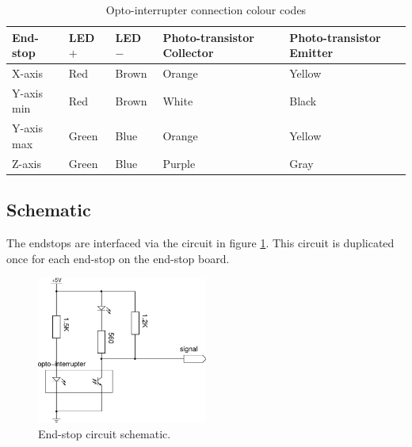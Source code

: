 			\begin{table}[p]
				\centering
				\begin{tabular}{l l l l l}
					\toprule
					End-stop & LED $+$ & LED $-$ & Photo-transistor Collector & Photo-transistor Emitter \\
					\midrule
					X-axis     & Red    & Brown  & Orange & Yellow \\
					\addlinespace
					Y-axis min & Red    & Brown  & White  & Black  \\
					Y-axis max & Green  & Blue   & Orange & Yellow \\
					\addlinespace
					Z-axis     & Green  & Blue   & Purple & Gray   \\
					\bottomrule
				\end{tabular}
				
				\caption{Opto-interrupter connection colour codes}
				\label{tab:endstopoptoconnect}
			\end{table}
			
			
		\subsection{Schematic}
			
			The endstops are interfaced via the circuit in figure \ref{fig:endstop}.
			This circuit is duplicated once for each end-stop on the end-stop board.
			
			\begin{figure}[p]
				\center
				\includegraphics[width=0.5\textwidth]{circuits/endstop.pdf}
				\caption{End-stop circuit schematic.}
				\label{fig:endstop}
			\end{figure}
